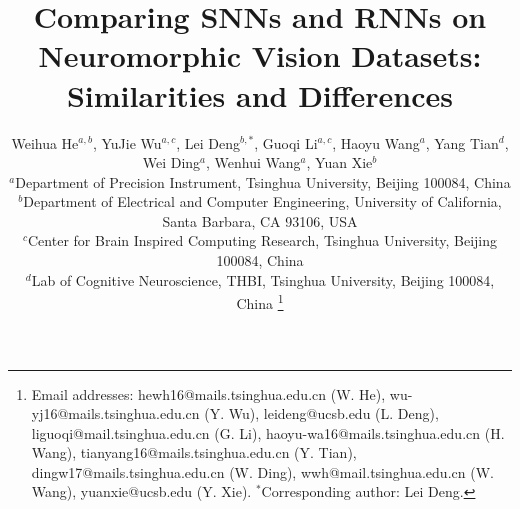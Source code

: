 \documentclass[journal,10pt,twocolumn]{IEEETran}
\begin{document}
\title{Comparing SNNs and RNNs on Neuromorphic Vision Datasets: Similarities and Differences}


\author{Weihua He$^{a,b}$, YuJie Wu$^{a,c}$, Lei Deng$^{b,*}$, Guoqi Li$^{a,c}$, Haoyu Wang$^{a}$, Yang Tian$^{d}$, \\Wei Ding$^{a}$, Wenhui Wang$^{a}$, Yuan Xie$^{b}$\\ \vspace{10pt}
$^a$Department of Precision Instrument, Tsinghua University, Beijing 100084, China\\
$^b$Department of Electrical and Computer Engineering, University of California, Santa Barbara, CA 93106, USA\\
$^c$Center for Brain Inspired Computing Research, Tsinghua University, Beijing 100084, China\\
$^d$Lab of Cognitive Neuroscience, THBI, Tsinghua University, Beijing 100084, China
\thanks{Email addresses: hewh16@mails.tsinghua.edu.cn (W. He), wu-yj16@mails.tsinghua.edu.cn (Y. Wu), leideng@ucsb.edu (L. Deng), liguoqi@mail.tsinghua.edu.cn (G. Li), haoyu-wa16@mails.tsinghua.edu.cn (H. Wang), tianyang16@mails.tsinghua.edu.cn (Y. Tian), dingw17@mails.tsinghua.edu.cn (W. Ding), wwh@mail.tsinghua.edu.cn (W. Wang), yuanxie@ucsb.edu (Y. Xie). $^{*}$Corresponding author: Lei Deng.}
}

\maketitle
\end{document}
